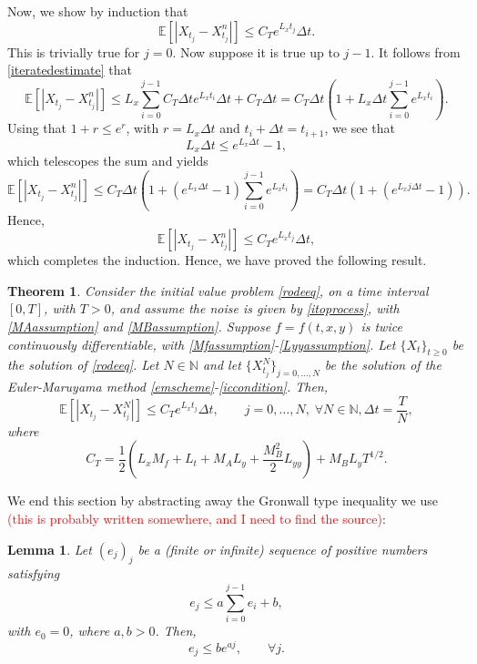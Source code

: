 \documentclass[reqno,12pt]{amsart}
\theoremstyle{plain}%
\newtheorem{thm}{Theorem}[section]
\newtheorem{lem}{Lemma}[section]
\theoremstyle{definition}
\begin{document}
Now, we show by induction that
$$
 \mathbb{E}\left[| X_{t_j} - X_{t_j}^n |\right] \leq C_T e^{L_x t_j}\Delta t .
$$
This is trivially true for $j=0$. Now suppose it is true up to $j-1$. It follows from \eqref{iteratedestimate} that
$$
 \mathbb{E}\left[| X_{t_j} - X_{t_j}^n |\right] \leq L_x \sum_{i=0}^{j-1} C_T \Delta t e^{L_x t_i}\Delta t + C_T \Delta t = C_T \Delta t\left( 1 + L_x \Delta t \sum_{i=0}^{j-1}  e^{L_x t_i} \right).
$$
Using that $1 + r \leq e^r$, with $r=L_x\Delta t$ and $t_i + \Delta t = t_{i+1}$, we see that
$$
L_x \Delta t \leq e^{L_x \Delta t} - 1,
$$
which telescopes the sum and yields
$$
 \mathbb{E}\left[| X_{t_j} - X_{t_j}^n |\right] \leq C_T \Delta t\left( 1 + (e^{L_x \Delta t} - 1)\sum_{i=0}^{j-1}  e^{L_x t_i} \right) = C_T \Delta t  \left(1 + (e^{L_x j\Delta t} - 1) \right).
$$
Hence,
$$
 \mathbb{E}\left[| X_{t_j} - X_{t_j}^n |\right] \leq C_T e^{L_x t_j}\Delta t ,
$$
which completes the induction. Hence, we have proved the following result.

\begin{thm}
  \label{EMstrongorder1}
  Consider the initial value problem \eqref{rodeeq}, on a time interval $[0, T]$, with $T > 0$, and assume the noise is given by \eqref{itoprocess}, with \eqref{MAassumption} and \eqref{MBassumption}. Suppose $f=f(t, x, y)$ is twice continuously differentiable, with \eqref{Mfassumption}-\eqref{Lyyassumption}. Let $\{X_t\}_{t\geq 0}$ be the solution of \eqref{rodeeq}. Let $N\in \mathbb{N}$ and let $\{X_{t_j}^N\}_{j=0, \ldots, N}$ be the solution of the Euler-Maruyama method \eqref{emscheme}-\eqref{iccondition}. Then,
  \begin{equation}
  \mathbb{E}\left[ \left| X_{t_j} - X_{t_j}^N \right| \right] \leq C_T e^{L_x t_j} \Delta t, \qquad j = 0, \ldots, N, \;\forall N \in \mathbb{N},  \Delta t = \frac{T}{N},
\end{equation}
  where
  \begin{equation}
    C_T = \frac{1}{2}\left(L_x M_f + L_t + M_A L_y  + \frac{M_B^2}{2}L_{yy} \right) + M_B L_yT^{1/2}.
  \end{equation}
\end{thm}

We end this section by abstracting away the Gronwall type inequality we use \textcolor{red}{(this is probably written somewhere, and I need to find the source)}:
\begin{lem}
Let $(e_j)_j$ be a (finite or infinite) sequence of positive numbers satisfying
\begin{equation}
  \label{integralgronwall}
  e_j \leq a \sum_{i=0}^{j-1} e_i + b,
\end{equation}
with $e_0 = 0$, where $a, b > 0$. Then,
\begin{equation}
  \label{estimateintegralgronwall}
  e_j \leq b e^{aj}, \qquad \forall j.
\end{equation}
\end{lem}
\end{document}
